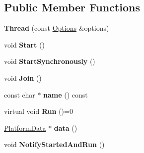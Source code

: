 \subsection*{Public Member Functions}
\begin{DoxyCompactItemize}
\item 
{\bfseries Thread} (const \hyperlink{classv8_1_1base_1_1_thread_1_1_options}{Options} \&options)\hypertarget{classv8_1_1base_1_1_thread_a3ddcd0a37fd3751be4e1cac06bedc447}{}\label{classv8_1_1base_1_1_thread_a3ddcd0a37fd3751be4e1cac06bedc447}

\item 
void {\bfseries Start} ()\hypertarget{classv8_1_1base_1_1_thread_a456aa1166279b4b0394abb2efe082753}{}\label{classv8_1_1base_1_1_thread_a456aa1166279b4b0394abb2efe082753}

\item 
void {\bfseries Start\+Synchronously} ()\hypertarget{classv8_1_1base_1_1_thread_a7001182e6207ce8dccb8fd0a8d5f3864}{}\label{classv8_1_1base_1_1_thread_a7001182e6207ce8dccb8fd0a8d5f3864}

\item 
void {\bfseries Join} ()\hypertarget{classv8_1_1base_1_1_thread_a03b039733dcd3df63085e74c587df9b7}{}\label{classv8_1_1base_1_1_thread_a03b039733dcd3df63085e74c587df9b7}

\item 
const char $\ast$ {\bfseries name} () const \hypertarget{classv8_1_1base_1_1_thread_acfcffed3f72a3ee08d77b06fbc533c87}{}\label{classv8_1_1base_1_1_thread_acfcffed3f72a3ee08d77b06fbc533c87}

\item 
virtual void {\bfseries Run} ()=0\hypertarget{classv8_1_1base_1_1_thread_a04c541b44be4fe9e6a878684e5232a87}{}\label{classv8_1_1base_1_1_thread_a04c541b44be4fe9e6a878684e5232a87}

\item 
\hyperlink{classv8_1_1base_1_1_thread_1_1_platform_data}{Platform\+Data} $\ast$ {\bfseries data} ()\hypertarget{classv8_1_1base_1_1_thread_a835107ac2f4dd322ef7998c8b543b336}{}\label{classv8_1_1base_1_1_thread_a835107ac2f4dd322ef7998c8b543b336}

\item 
void {\bfseries Notify\+Started\+And\+Run} ()\hypertarget{classv8_1_1base_1_1_thread_af31dcce079481573bddda99840e56a88}{}\label{classv8_1_1base_1_1_thread_af31dcce079481573bddda99840e56a88}

\end{DoxyCompactItemize}

